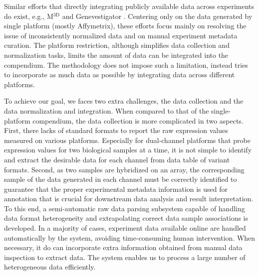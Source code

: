 Similar efforts that directly integrating publicly available data across
experiments do exist, e.g., M$^{\textrm{3D}}$ \cite{Faith2008} and
Genevestigator \cite{Hruz2008}.
%
Centering only on the data generated by single platform (mostly
Affymetrix), these efforts focus mainly on resolving the issue of
inconsistently normalized data and on manual experiment metadata curation.
%
The platform restriction, although simplifies data collection and
normalization tasks, limits the amount of data can be integrated into the
compendium.
The methodology does not impose such a limitation, instead tries to
incorporate as much data as possible by integrating data across different
platforms.

To achieve our goal, we faces two extra challenges, the data collection and
the data normalization and integration.
%
When compared to that of the single-platform compendium, the data
collection is more complicated in two aspects.
%
First, there lacks of standard formats to report the raw expression values
measured on various platforms.  Especially for dual-channel platforms that
probe expression values for two biological samples at a time, it is not
simple to identify and extract the desirable data for each channel from
data table of variant formats.
%
Second, as two samples are hybridized on an array, the corresponding sample
of the data generated in each channel must be correctly identified to
guarantee that the proper experimental metadata information is used for
annotation that is crucial for downstream data analysis and result
interpretation.
%
To this end, a semi-automatic raw data parsing subsystem capable of
handling data format heterogeneity and extrapolating correct data sample
associations is developed.
%
In a majority of cases, experiment data available online are handled
automatically by the system, avoiding time-consuming human intervention.
%
When necessary, it do can incorporate extra information obtained from
manual data inspection to extract data.
%
The system enables us to process a large number of heterogeneous data
efficiently.


